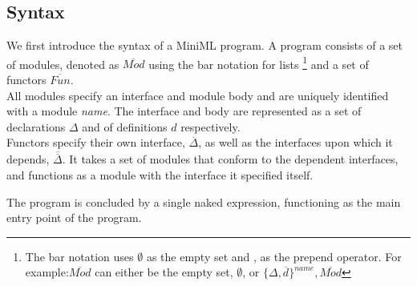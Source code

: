\documentclass[10pt,a4paper,draft]{article}
\begin{document}
\begin{flushleft}
\section{Syntax}


\newcommand{\longspace}{\;\;\;\;\;\;}
\newcommand{\inlinecode}{\texttt}
We first introduce the syntax of a MiniML program. A program consists of a set of modules, denoted as $\overline{\mathit{Mod}}$ using the bar notation for lists \footnote{The bar notation uses $\emptyset$ as the empty set and , as the prepend operator. For example:$\overline{\mathit{Mod}}$ can either be the empty set, $\emptyset$, or $\lbrace \Delta, \overline{\mathit{d}}\rbrace^{name}, \overline{Mod}$} and a set of functors $\overline{\mathit{Fun}}$.
\\[2ex]
All modules specify an interface and module body and are uniquely identified with a module \textit{name}. The interface and body are represented as a set of declarations $\Delta$ and of definitions $d$ respectively.
\\[2ex]
Functors specify their own interface, $\overline{\Delta}$, as well as the interfaces upon which it depends, $\overline{\overline{\Delta}}$. It takes a set of modules that conform to the dependent interfaces, and functions as a module with the interface it specified itself.

The program is concluded by a single naked expression, functioning as the main entry point of the program.


\end{flushleft}
\end{document}
